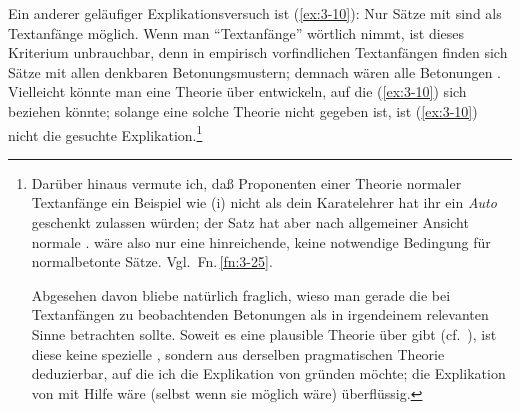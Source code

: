 \documentclass[output=paper]{langsci/langscibook}
\begin{document}
Ein anderer geläufiger Explikationsversuch ist (\ref{ex:3-10}):
\ea
\label{ex:3-10}
Nur Sätze mit  sind als Textanfänge möglich.
\z
Wenn man "`Textanfänge"' wörtlich nimmt, ist dieses Kriterium unbrauchbar, denn in empirisch
vorfindlichen Textanfängen finden sich Sätze mit allen denkbaren Betonungsmustern; demnach wären
alle Betonungen . Vielleicht könnte man eine Theorie über  entwickeln, auf die (\ref{ex:3-10}) sich beziehen könnte; solange eine solche Theorie
nicht gegeben ist, ist (\ref{ex:3-10}) nicht die gesuchte Explikation.\footnote{\label{fn:3-2}%
  Darüber hinaus vermute ich, daß Proponenten einer Theorie normaler Textanfänge ein Beispiel wie (i) nicht als 
  \ea
  \label{ex:3-fn2}
  dein Karatelehrer hat ihr ein \textit{Auto} geschenkt
  \z
  zulassen würden; der Satz hat aber nach allgemeiner Ansicht normale
  .  wäre also nur eine
  hinreichende, keine notwendige Bedingung für normalbetonte
  Sätze. Vgl.\ Fn.\,\ref{fn:3-25}.

  Abgesehen davon bliebe natürlich fraglich, wieso man gerade die bei
  Textanfängen zu beobachtenden Betonungen als  in
  irgendeinem relevanten Sinne betrachten sollte. Soweit es eine
  plausible Theorie über  gibt (cf.\ \citealt{Clark77}),
  ist diese keine spezielle , sondern aus derselben
  pragmatischen Theorie deduzierbar, auf die ich die Explikation von
   gründen möchte; \dash die Explikation von
   mit Hilfe  wäre
  (selbst wenn sie möglich wäre) überflüssig.%
}
\end{document}
